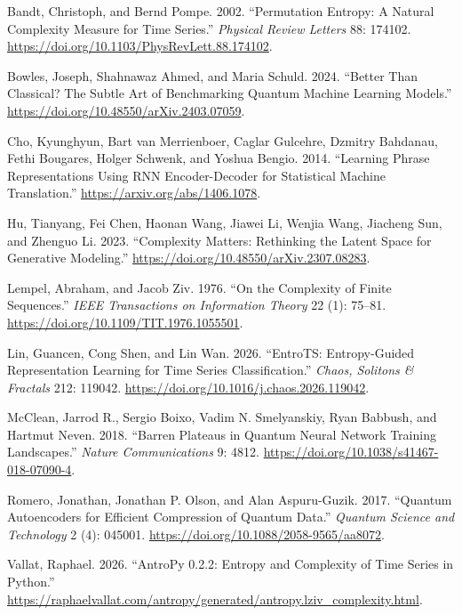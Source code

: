 \documentclass[
  11pt,
]{article}
\newlength{\cslhangindent}
\newlength{\cslentryspacingunit} %
\newenvironment{CSLReferences}[2] %
 {%
  \setlength{\parindent}{0pt}
  \ifodd #1
  \let\oldpar\par
  \def\par{\hangindent=\cslhangindent\oldpar}
  \fi
  \setlength{\parskip}{#2\cslentryspacingunit}
 }%
 {}
\begin{document}
\hypertarget{refs}{}
\begin{CSLReferences}{1}{0}
\leavevmode{}%
Bandt, Christoph, and Bernd Pompe. 2002. {``Permutation Entropy: A
Natural Complexity Measure for Time Series.''} \emph{Physical Review
Letters} 88: 174102.
\url{https://doi.org/10.1103/PhysRevLett.88.174102}.

\leavevmode{}%
Bowles, Joseph, Shahnawaz Ahmed, and Maria Schuld. 2024. {``Better Than
Classical? The Subtle Art of Benchmarking Quantum Machine Learning
Models.''} \url{https://doi.org/10.48550/arXiv.2403.07059}.

\leavevmode{}%
Cho, Kyunghyun, Bart van Merrienboer, Caglar Gulcehre, Dzmitry Bahdanau,
Fethi Bougares, Holger Schwenk, and Yoshua Bengio. 2014. {``Learning
Phrase Representations Using {RNN} Encoder-Decoder for Statistical
Machine Translation.''} \url{https://arxiv.org/abs/1406.1078}.

\leavevmode{}%
Hu, Tianyang, Fei Chen, Haonan Wang, Jiawei Li, Wenjia Wang, Jiacheng
Sun, and Zhenguo Li. 2023. {``Complexity Matters: Rethinking the Latent
Space for Generative Modeling.''}
\url{https://doi.org/10.48550/arXiv.2307.08283}.

\leavevmode{}%
Lempel, Abraham, and Jacob Ziv. 1976. {``On the Complexity of Finite
Sequences.''} \emph{IEEE Transactions on Information Theory} 22 (1):
75--81. \url{https://doi.org/10.1109/TIT.1976.1055501}.

\leavevmode{}%
Lin, Guancen, Cong Shen, and Lin Wan. 2026. {``{EntroTS}: Entropy-Guided
Representation Learning for Time Series Classification.''} \emph{Chaos,
Solitons \& Fractals} 212: 119042.
\url{https://doi.org/10.1016/j.chaos.2026.119042}.

\leavevmode{}%
McClean, Jarrod R., Sergio Boixo, Vadim N. Smelyanskiy, Ryan Babbush,
and Hartmut Neven. 2018. {``Barren Plateaus in Quantum Neural Network
Training Landscapes.''} \emph{Nature Communications} 9: 4812.
\url{https://doi.org/10.1038/s41467-018-07090-4}.

\leavevmode{}%
Romero, Jonathan, Jonathan P. Olson, and Alan Aspuru-Guzik. 2017.
{``Quantum Autoencoders for Efficient Compression of Quantum Data.''}
\emph{Quantum Science and Technology} 2 (4): 045001.
\url{https://doi.org/10.1088/2058-9565/aa8072}.

\leavevmode{}%
Vallat, Raphael. 2026. {``{AntroPy} 0.2.2: Entropy and Complexity of
Time Series in {Python}.''}
\url{https://raphaelvallat.com/antropy/generated/antropy.lziv_complexity.html}.

\end{CSLReferences}
\end{document}
